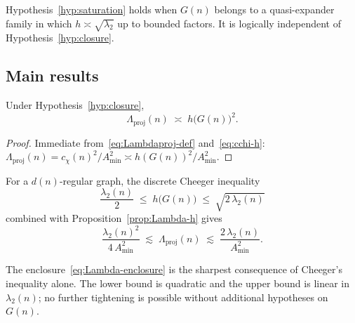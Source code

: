     \noindent
    Hypothesis~\ref{hyp:saturation} holds when $G(n)$ belongs to a quasi-expander
    family in which $h \asymp \sqrt{\lambda_2}$ up to bounded factors.
    It is logically independent of Hypothesis~\ref{hyp:closure}.

  \subsection{Main results}
    \label{sec:framework:results}

    \begin{proposition}
      \label{prop:Lambda-h}
      Under Hypothesis~\ref{hyp:closure},
      \begin{equation}
        \label{eq:Lambda-h2}
        \Lambda_{\mathrm{proj}}(n) \;\asymp\; h\bigl(G(n)\bigr)^2.
      \end{equation}
    \end{proposition}

    \begin{proof}
      Immediate from~\eqref{eq:Lambdaproj-def} and~\eqref{eq:cchi-h}:
      $\Lambda_{\mathrm{proj}}(n) = c_\chi(n)^2/A_{\min}^2
      \asymp h(G(n))^2/A_{\min}^2$.
    \end{proof}

    \begin{corollary}
      \label{cor:cheeger-enclosure}
      For a $d(n)$-regular graph, the discrete Cheeger inequality~\cite{Chung1997}
      \begin{equation}
        \label{eq:cheeger-ineq}
        \frac{\lambda_2(n)}{2} \;\leq\; h\bigl(G(n)\bigr) \;\leq\; \sqrt{2\,\lambda_2(n)}
      \end{equation}
      combined with Proposition~\ref{prop:Lambda-h} gives
      \begin{equation}
        \label{eq:Lambda-enclosure}
        \frac{\lambda_2(n)^2}{4\,A_{\min}^2}
        \;\lesssim\; \Lambda_{\mathrm{proj}}(n)
        \;\lesssim\; \frac{2\,\lambda_2(n)}{A_{\min}^2}.
      \end{equation}
    \end{corollary}

    \begin{remark}
      The enclosure~\eqref{eq:Lambda-enclosure} is the sharpest consequence of
      Cheeger's inequality alone.
      The lower bound is quadratic and the upper bound is linear in $\lambda_2(n)$;
      no further tightening is possible without additional hypotheses on $G(n)$.
    \end{remark}

